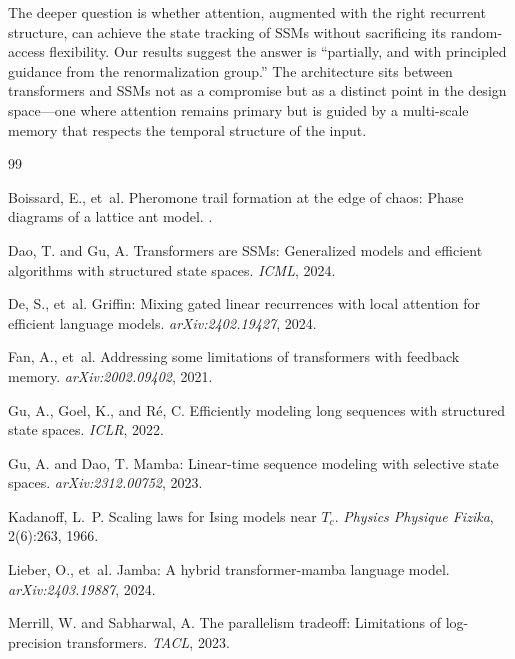 \documentclass[11pt,a4paper]{article}
\begin{document}
The deeper question is whether attention, augmented with the right
recurrent structure, can achieve the state tracking of SSMs without
sacrificing its random-access flexibility.  Our results suggest the
answer is ``partially, and with principled guidance from the
renormalization group.''  The architecture sits between transformers
and SSMs not as a compromise but as a distinct point in the design
space---one where attention remains primary but is guided by a
multi-scale memory that respects the temporal structure of the input.



\begin{thebibliography}{99}

Boissard, E., et~al.
\newblock Pheromone trail formation at the edge of chaos: Phase diagrams of a
  lattice ant model.
.

Dao, T. and Gu, A.
\newblock Transformers are SSMs: Generalized models and efficient algorithms
  with structured state spaces.
\newblock \emph{ICML}, 2024.

De, S., et~al.
\newblock Griffin: Mixing gated linear recurrences with local attention for
  efficient language models.
\newblock \emph{arXiv:2402.19427}, 2024.

Fan, A., et~al.
\newblock Addressing some limitations of transformers with feedback memory.
\newblock \emph{arXiv:2002.09402}, 2021.

Gu, A., Goel, K., and R\'{e}, C.
\newblock Efficiently modeling long sequences with structured state spaces.
\newblock \emph{ICLR}, 2022.

Gu, A. and Dao, T.
\newblock Mamba: Linear-time sequence modeling with selective state spaces.
\newblock \emph{arXiv:2312.00752}, 2023.

Kadanoff, L.~P.
\newblock Scaling laws for {I}sing models near $T_c$.
\newblock \emph{Physics Physique Fizika}, 2(6):263, 1966.

Lieber, O., et~al.
\newblock Jamba: A hybrid transformer-mamba language model.
\newblock \emph{arXiv:2403.19887}, 2024.

Merrill, W. and Sabharwal, A.
\newblock The parallelism tradeoff: Limitations of log-precision transformers.
\newblock \emph{TACL}, 2023.


\end{thebibliography}
\end{document}
